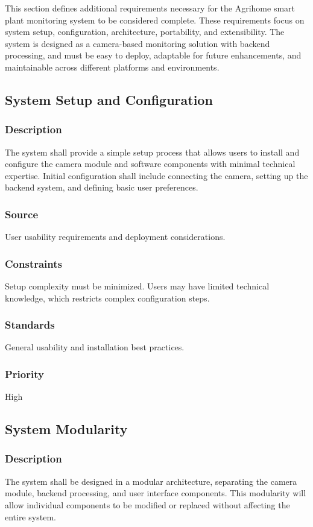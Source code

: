 

This section defines additional requirements necessary for the Agrihome smart plant monitoring system to be considered complete. These requirements focus on system setup, configuration, architecture, portability, and extensibility. The system is designed as a camera-based monitoring solution with backend processing, and must be easy to deploy, adaptable for future enhancements, and maintainable across different platforms and environments.

\subsection{System Setup and Configuration}
\subsubsection{Description}
The system shall provide a simple setup process that allows users to install and configure the camera module and software components with minimal technical expertise. Initial configuration shall include connecting the camera, setting up the backend system, and defining basic user preferences.

\subsubsection{Source}
User usability requirements and deployment considerations.

\subsubsection{Constraints}
Setup complexity must be minimized. Users may have limited technical knowledge, which restricts complex configuration steps.

\subsubsection{Standards}
General usability and installation best practices.

\subsubsection{Priority}
High


\subsection{System Modularity}
\subsubsection{Description}
The system shall be designed in a modular architecture, separating the camera module, backend processing, and user interface components. This modularity will allow individual components to be modified or replaced without affecting the entire system.

